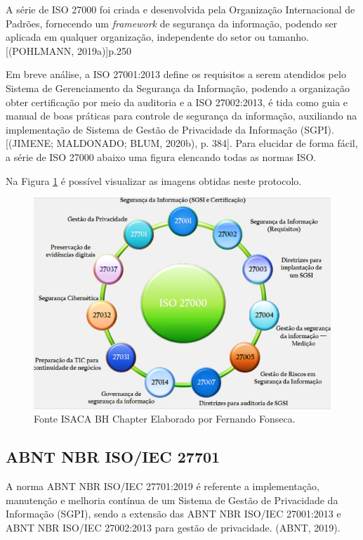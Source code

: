 \documentclass[
	12pt,				%
	openright,			%
	oneside,			%
	a4paper,			%
	english,			%
	french,				%
	spanish,			%
	brazil,				%
	]{abntex2}
\begin{document}
A série de ISO 27000 foi criada e desenvolvida pela Organização Internacional de Padrões, fornecendo um \textit{framework} de segurança da informação, podendo ser aplicada em qualquer organização, independente do setor ou tamanho. [(POHLMANN, 2019a)]p.250

Em breve análise, a ISO 27001:2013 define os requisitos a serem atendidos pelo Sistema de Gerenciamento da Segurança da Informação, podendo a organização obter certificação por meio da auditoria e a ISO 27002:2013, é tida como guia e manual de boas práticas para controle de segurança da informação, auxiliando na implementação de Sistema de Gestão de Privacidade da Informação (SGPI). [(JIMENE; MALDONADO; BLUM, 2020b), p. 384]. Para elucidar de forma fácil, a série de ISO 27000 abaixo uma figura elencando todas as normas ISO.

Na Figura \ref{fig: Iso } é possível visualizar as imagens obtidas neste protocolo.
\begin{figure}[ht]
    \centering
    \includegraphics[width=6.0in]{Images/03ISO.jpeg}
    \caption{Fonte ISACA BH Chapter Elaborado por Fernando Fonseca.}
    \label{fig: Iso }
\end{figure}

\subsection{ABNT NBR ISO/IEC 27701 }

A norma ABNT NBR ISO/IEC 27701:2019 é referente a implementação, manutenção e melhoria contínua de um Sistema de Gestão de Privacidade da Informação (SGPI), sendo a extensão das ABNT NBR ISO/IEC 27001:2013 e ABNT NBR ISO/IEC 27002:2013 para gestão de privacidade. (ABNT, 2019).
\end{document}
